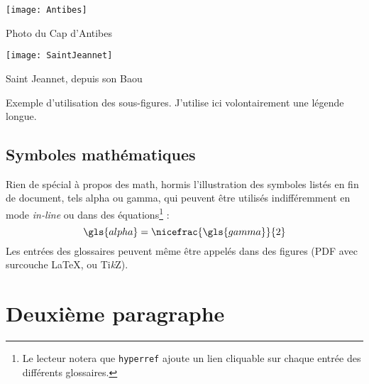 	\begin{figureth}
		\begin{subfigureth}{0.4\textwidth}
			\texttt{[image: Antibes]}
			\caption{Photo du Cap d'Antibes}
				\label{sub:Antibes}
		\end{subfigureth}
		\begin{subfigureth}{0.4\textwidth}
			\texttt{[image: SaintJeannet]}
			\caption{Saint Jeannet, depuis son Baou}
				\label{sub:SaintJeannet}
		\end{subfigureth}
		\caption[Légende courte pour la figure]{Exemple d'utilisation des sous-figures. J'utilise ici volontairement une légende longue.}		
			\label{fig:exemple}
	\end{figureth}
	
	\subsection{Symboles mathématiques}
	Rien de spécial à propos des math, hormis l'illustration des symboles listés en fin de document, tels \gls{alpha} ou \gls{gamma}, qui peuvent être utilisés indifféremment en mode \emph{in-line} ou dans des équations\footnote{Le lecteur notera que \texttt{hyperref} ajoute un lien cliquable sur chaque entrée des différents glossaires.} :
	\begin{equation}
		\gls{alpha}=\nicefrac{\gls{gamma}}{2}
		\label{eq:alphagamma}
	\end{equation}
Les entrées des glossaires peuvent même être appelés dans des figures (PDF avec surcouche \LaTeX, ou Ti\textit{k}Z).
	

\section{Deuxième paragraphe}
\blindtext


